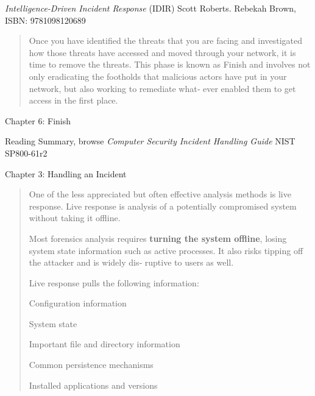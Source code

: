 \documentclass[Screen16to9,17pt]{foils}
\begin{document}

\emph{Intelligence-Driven Incident Response} (IDIR)
 Scott Roberts. Rebekah Brown, ISBN: 9781098120689

\begin{quote}
Once you have identified the threats that you are facing and investigated how those
threats have accessed and moved through your network, it is time to remove the
threats. This phase is known as Finish and involves not only eradicating the footholds
that malicious actors have put in your network, but also working to remediate what‐
ever enabled them to get access in the first place.
\end{quote}

\begin{list2}
\item Chapter 6: Finish
\end{list2}

Reading Summary, browse \emph{Computer Security Incident Handling Guide} NIST SP800-61r2
\begin{list2}
\item  Chapter 3: Handling an Incident
\end{list2}




\begin{quote}
One of the less appreciated but often effective analysis methods is live response. Live
response is analysis of a potentially compromised system without taking it offline.

Most forensics analysis requires {\bf turning the system offline}, losing system state information such as active processes. It also risks tipping off the attacker and is widely dis‐
ruptive to users as well.

Live response pulls the following information:
\begin{list2}
\item Configuration information
\item System state
\item Important file and directory information
\item Common persistence mechanisms
\item Installed applications and versions
\end{list2}
\end{quote}


\end{document}
